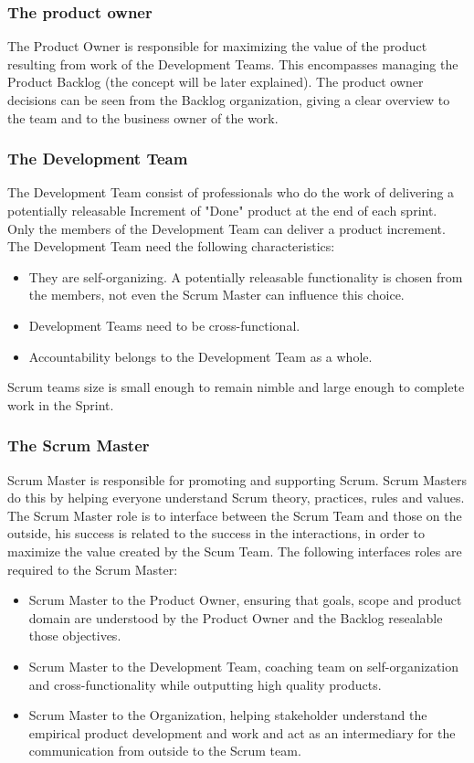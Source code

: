 \documentclass[../main.tex]{subfiles}
\begin{document}
\subsubsection{The product owner}
The Product Owner is responsible for maximizing the value of the product resulting from work of the Development Teams. This encompasses managing the Product Backlog (the concept will be later explained). The product owner decisions can be seen from the Backlog organization, giving a clear overview to the team and to the business owner of the work.\\
\subsubsection{The Development Team}
The Development Team consist of professionals who do the work of delivering a potentially releasable Increment of "Done" product at the end of each sprint. Only the members of the Development Team can deliver a product increment. \\
The Development Team need the following characteristics:
\begin{itemize}
    \item They are self-organizing. A potentially releasable functionality is chosen from the members, not even the Scrum Master can influence this choice. 
    \item Development Teams need to be cross-functional. 
    \item Accountability belongs to the Development Team as a whole. 
\end{itemize}
Scrum teams size is small enough to remain nimble and large enough to complete work in the Sprint.
\subsubsection{The Scrum Master}
Scrum Master is responsible for promoting and supporting Scrum. Scrum Masters do this by helping everyone understand Scrum theory, practices, rules and values. 
The Scrum Master role is to interface between the Scrum Team and those on the outside, his success is related to the success in the interactions, in order to maximize the value created by the Scum Team. The following interfaces roles are required to the Scrum Master:
\begin{itemize}
    \item Scrum Master to the Product Owner, ensuring that goals, scope and product domain are understood by the Product Owner and the Backlog resealable those objectives.
    \item Scrum Master to the Development Team, coaching team on self-organization and cross-functionality while outputting high quality products. 
    \item Scrum Master to the Organization, helping stakeholder understand the empirical product development and work and act as an intermediary for the communication from outside to the Scrum team. 
\end{itemize}
\end{document}
